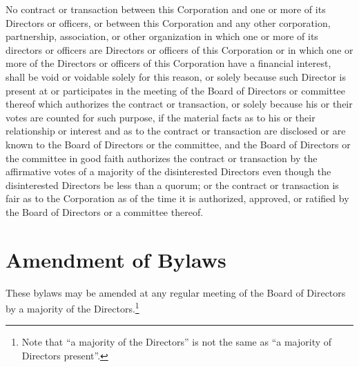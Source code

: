 No contract or transaction between this Corporation and one or more of its
Directors or officers, or between this Corporation and any other corporation,
partnership, association, or other organization in which one or more of its
directors or officers are Directors or officers of this Corporation or in which
one or more of the Directors or officers of this Corporation have a financial
interest, shall be void or voidable solely for this reason, or solely because
such Director is present at or participates in the meeting of the Board of
Directors or committee thereof which authorizes the contract or transaction, or
solely because his or their votes are counted for such purpose, if the material
facts as to his or their relationship or interest and as to the contract or
transaction are disclosed or are known to the Board of Directors or the
committee, and the Board of Directors or the committee in good faith authorizes
the contract or transaction by the affirmative votes of a majority of the
disinterested Directors even though the disinterested Directors be less than a
quorum; or the contract or transaction is fair as to the Corporation as of the
time it is authorized, approved, or ratified by the Board of Directors or a
committee thereof.

\section{Amendment of Bylaws}

These bylaws may be amended at any regular meeting of the Board of Directors by
a majority of the Directors.\footnote{Note that ``a majority of the Directors''
is not the same as ``a majority of Directors present''.}
